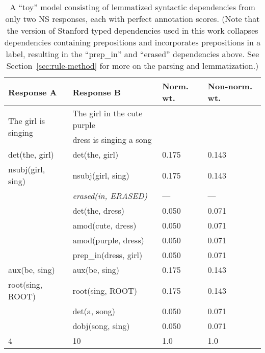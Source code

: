 \begin{table}[htb!]
\begin{center}
\begin{tabular}{|l|l|l|l|}
\hline
Response A & Response B & Norm. wt. & Non-norm. wt.\\
\hline
\multirow{2}{*}{The girl is singing} & The girl in the cute purple & & \\
& dress is singing a song & & \\
\hline
\hline
det(the, girl) & det(the, girl) & 0.175 & 0.143 \\
\hline
nsubj(girl, sing) & nsubj(girl, sing) & 0.175 & 0.143 \\
\hline
& \textit{erased(in, ERASED)} & --- & --- \\
\hline
& det(the, dress) & 0.050 & 0.071 \\
\hline
& amod(cute, dress) & 0.050 & 0.071 \\
\hline
& amod(purple, dress) & 0.050 & 0.071 \\
\hline
& prep\_in(dress, girl) & 0.050 & 0.071 \\
\hline
aux(be, sing) & aux(be, sing) & 0.175 & 0.143 \\
\hline
root(sing, ROOT) & root(sing, ROOT) & 0.175 & 0.143 \\
\hline
& det(a, song) & 0.050 & 0.071 \\
\hline
& dobj(song, sing) & 0.050 & 0.071 \\
\hline
\hline
4 & 10 & 1.0 & 1.0 \\
\hline
\end{tabular}
\caption{\label{tab:normalize-responses-deps} A ``toy'' model consisting of lemmatized syntactic dependencies from only two NS responses, each with perfect annotation scores. (Note that the version of Stanford typed dependencies used in this work collapses dependencies containing prepositions and incorporates prepositions in a label, resulting in the ``prep\_in'' and ``erased'' dependencies above. See Section~\ref{sec:rule-method} for more on the parsing and lemmatization.)}
\end{center}
\end{table}


